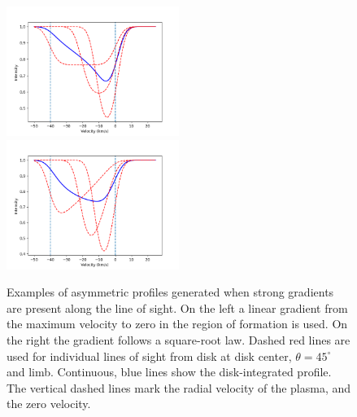 \documentclass{/Users/art2/TeX/aanda/aa}
\def\kms {km\,s$^{-1}$}
\begin{document}
\begin{figure}
\includegraphics[width=0.5\textwidth]{Figure_1b.png}
\includegraphics[width=0.5\textwidth]{Figure_1c.png}
\caption{Examples of asymmetric profiles generated when strong gradients are present along the line of sight. 
On the left a linear gradient from the maximum velocity to zero in the region of formation is used. On the right the 
gradient follows a square-root law. Dashed red lines are used for individual lines of sight from disk at 
disk center, $\theta =45^{\circ}$ and limb. Continuous, blue lines show the disk-integrated profile.  The vertical dashed 
lines mark the radial velocity of the plasma, and the zero velocity.}
\label{example}
\end{figure}
\end{document}
